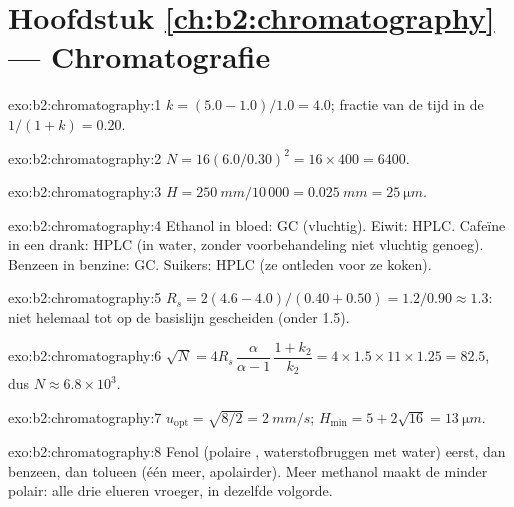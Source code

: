 \section*{Hoofdstuk \ref{ch:b2:chromatography} --- Chromatografie}

\begin{solution}{exo:b2:chromatography:1}
$k = (5.0 - 1.0)/1.0 = 4.0$; fractie van de tijd in de  $1/(1 + k) = 0.20$.
\end{solution}

\begin{solution}{exo:b2:chromatography:2}
$N = 16(6.0/0.30)^2 = 16 \times 400 = 6400$.
\end{solution}

\begin{solution}{exo:b2:chromatography:3}
$H = \qty{250}{mm}/10\,000 = \qty{0.025}{mm} = \qty{25}{\micro m}$.
\end{solution}

\begin{solution}{exo:b2:chromatography:4}
Ethanol in bloed: GC (vluchtig). Eiwit: HPLC. Cafeïne in een drank: HPLC (in water, zonder voorbehandeling niet vluchtig
genoeg). Benzeen in benzine: GC. Suikers: HPLC (ze ontleden voor ze koken).
\end{solution}

\begin{solution}{exo:b2:chromatography:5}
$R_s = 2(4.6 - 4.0)/(0.40 + 0.50) = 1.2/0.90 \approx 1.3$: niet helemaal tot op de basislijn gescheiden (onder 1.5).
\end{solution}

\begin{solution}{exo:b2:chromatography:6}
$\sqrt N = 4R_s\,\dfrac{\alpha}{\alpha - 1}\,\dfrac{1 + k_2}{k_2} = 4 \times 1.5 \times 11 \times 1.25 =
82.5$, dus $N \approx 6.8 \times 10^3$.
\end{solution}

\begin{solution}{exo:b2:chromatography:7}
$u_{\mathrm{opt}} = \sqrt{8/2} = \qty{2}{mm/s}$; $H_{\min} = 5 + 2\sqrt{16} = \qty{13}{\micro m}$.
\end{solution}

\begin{solution}{exo:b2:chromatography:8}
Fenol (polaire , waterstofbruggen met water) eerst, dan benzeen, dan tolueen (één 
meer, apolairder). Meer methanol maakt de  minder polair: alle drie elueren vroeger, in
dezelfde volgorde.
\end{solution}

